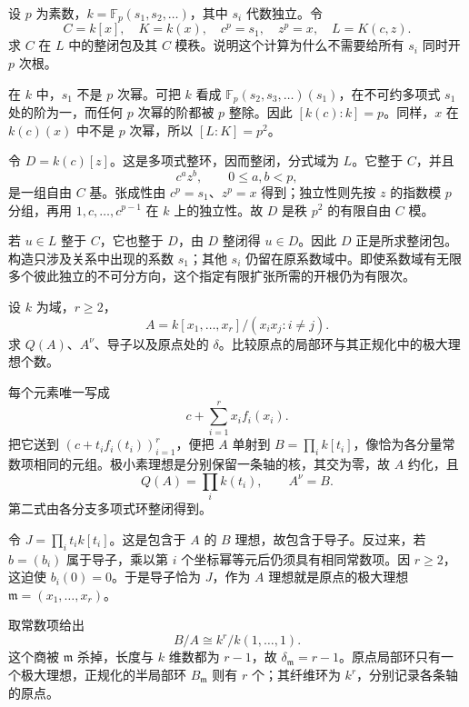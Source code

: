 \begin{exercise}\label{g5:ex:infinite-p-rank-finite-roots}
	设 \(p\) 为素数，\(k=\mathbb F_p(s_1,s_2,\ldots)\)，其中 \(s_i\) 代数独立。令
	\[
		C=k[x],\quad K=k(x),\quad
		c^p=s_1,\quad z^p=x,\quad L=K(c,z).
	\]
	求 \(C\) 在 \(L\) 中的整闭包及其 \(C\) 模秩。说明这个计算为什么不需要给所有 \(s_i\) 同时开 \(p\) 次根。
\end{exercise}
\begin{solution}
	在 \(k\) 中，\(s_1\) 不是 \(p\) 次幂。可把 \(k\) 看成 \(\mathbb F_p(s_2,s_3,\ldots)(s_1)\)，在不可约多项式 \(s_1\) 处的阶为一，而任何 \(p\) 次幂的阶都被 \(p\) 整除。因此 \([k(c):k]=p\)。同样，\(x\) 在 \(k(c)(x)\) 中不是 \(p\) 次幂，所以 \([L:K]=p^2\)。

	令 \(D=k(c)[z]\)。这是多项式整环，因而整闭，分式域为 \(L\)。它整于 \(C\)，并且
	\[
		c^a z^b,\qquad 0\leq a,b<p,
	\]
	是一组自由 \(C\) 基。张成性由 \(c^p=s_1\)、\(z^p=x\) 得到；独立性则先按 \(z\) 的指数模 \(p\) 分组，再用 \(1,c,\ldots,c^{p-1}\) 在 \(k\) 上的独立性。故 \(D\) 是秩 \(p^2\) 的有限自由 \(C\) 模。

	若 \(u\in L\) 整于 \(C\)，它也整于 \(D\)，由 \(D\) 整闭得 \(u\in D\)。因此 \(D\) 正是所求整闭包。构造只涉及关系中出现的系数 \(s_1\)；其他 \(s_i\) 仍留在原系数域中。即使系数域有无限多个彼此独立的不可分方向，这个指定有限扩张所需的开根仍为有限次。
\end{solution}

\begin{exercise}\label{g5:ex:coordinate-axes-normalization}
	设 \(k\) 为域，\(r\geq2\)，
	\[
		A=k[x_1,\ldots,x_r]/(x_ix_j:i\ne j).
	\]
	求 \(Q(A)\)、\(A^\nu\)、导子以及原点处的 \(\delta\)。比较原点的局部环与其正规化中的极大理想个数。
\end{exercise}
\begin{solution}
	每个元素唯一写成
	\[
		c+\sum_{i=1}^r x_if_i(x_i).
	\]
	把它送到 \((c+t_if_i(t_i))_{i=1}^r\)，便把 \(A\) 单射到
	\(B=\prod_i k[t_i]\)，像恰为各分量常数项相同的元组。极小素理想是分别保留一条轴的核，其交为零，故 \(A\) 约化，且
	\[
		Q(A)=\prod_i k(t_i),\qquad A^\nu=B.
	\]
	第二式由各分支多项式环整闭得到。

	令 \(J=\prod_i t_i k[t_i]\)。这是包含于 \(A\) 的 \(B\) 理想，故包含于导子。反过来，若 \(b=(b_i)\) 属于导子，乘以第 \(i\) 个坐标幂等元后仍须具有相同常数项。因 \(r\geq2\)，这迫使 \(b_i(0)=0\)。于是导子恰为 \(J\)，作为 \(A\) 理想就是原点的极大理想 \(\mathfrak m=(x_1,\ldots,x_r)\)。

	取常数项给出
	\[
		B/A\cong k^r/k(1,\ldots,1).
	\]
	这个商被 \(\mathfrak m\) 杀掉，长度与 \(k\) 维数都为 \(r-1\)，故 \(\delta_{\mathfrak m}=r-1\)。原点局部环只有一个极大理想，正规化的半局部环 \(B_{\mathfrak m}\) 则有 \(r\) 个；其纤维环为 \(k^r\)，分别记录各条轴的原点。
\end{solution}

